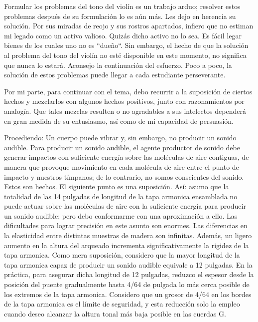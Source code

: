 \documentclass[12pt]{book}
\begin{document}
Formular los problemas del tono del violín es un trabajo arduo; resolver estos problemas después de su formulación lo es aún más. Les dejo en herencia su solución. Por sus miradas de reojo y sus rostros apartados, infiero que no estiman mi legado como un activo valioso. Quizás dicho activo no lo sea. Es fácil legar bienes de los cuales uno no es ``dueño``. Sin embargo, el hecho de que la solución al problema del tono del violín no esté disponible en este momento, no significa que nunca lo estará. Aconsejo la continuación del esfuerzo. Poco a poco, la solución de estos problemas puede llegar a cada estudiante perseverante.

Por mi parte, para continuar con el tema, debo recurrir a la suposición de ciertos hechos y mezclarlos con algunos hechos positivos, junto con razonamientos por analogía. Que tales mezclas resulten o no agradables a sus intelectos dependerá en gran medida de su entusiasmo, así como de mi capacidad de persuasión.

Procediendo: Un cuerpo puede vibrar y, sin embargo, no producir un sonido audible. Para producir un sonido audible, el agente productor de sonido debe generar impactos con suficiente energía sobre las moléculas de aire contiguas, de manera que provoque movimiento en cada molécula de aire entre el punto de impacto y nuestros tímpanos; de lo contrario, no somos conscientes del sonido. Estos son hechos. El siguiente punto es una suposición. Así: asumo que la totalidad de las 14 pulgadas de longitud de la tapa armonica ensamblada no puede actuar sobre las moléculas de aire con la suficiente energía para producir un sonido audible; pero debo conformarme con una aproximación a ello. Las dificultades para lograr precisión en este asunto son enormes. Las diferencias en la elasticidad entre distintas muestras de madera son infinitas. Además, un ligero aumento en la altura del arqueado incrementa significativamente la rigidez de la tapa armonica. Como mera suposición, considero que la mayor longitud de la tapa armonica capaz de producir un sonido audible equivale a 12 pulgadas. En la práctica, para asegurar dicha longitud de 12 pulgadas, reduzco el espesor desde la posición del puente gradualmente hasta 4/64 de pulgada lo más cerca posible de los extremos de la tapa armonica. Considero que un grosor de 4/64 en los bordes de la tapa armonica es el límite de seguridad, y esta reducción solo la empleo cuando deseo alcanzar la altura tonal más baja posible en las cuerdas G.
\end{document}
